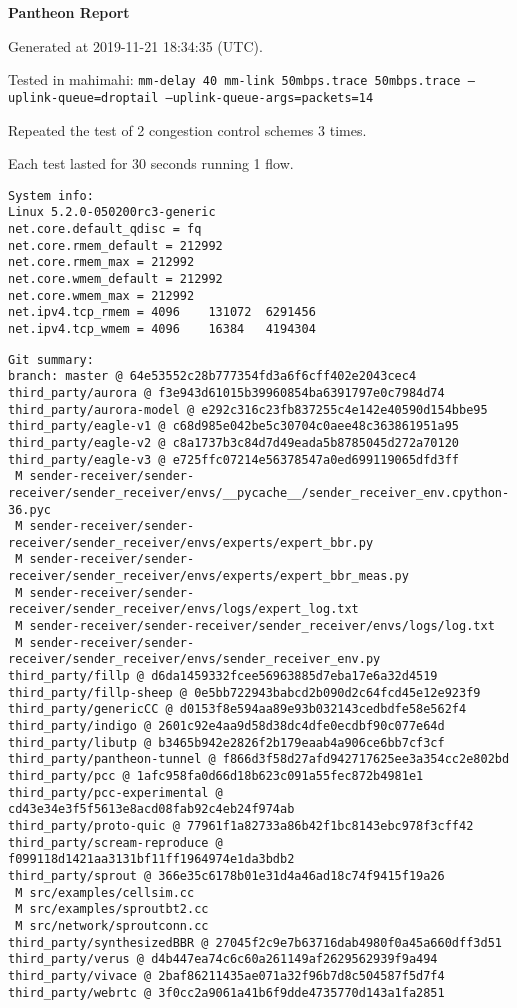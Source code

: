 \documentclass{article}
\begin{document}
\centerline{\textbf{\large{Pantheon Report}}}
\vspace{20pt}

Generated at 2019-11-21 18:34:35 (UTC).

Tested in mahimahi: \texttt{mm-delay 40 mm-link 50mbps.trace 50mbps.trace --uplink-queue=droptail --uplink-queue-args=packets=14}

Repeated the test of 2 congestion control schemes 3 times.

Each test lasted for 30 seconds running 1 flow.

\begin{verbatim}
System info:
Linux 5.2.0-050200rc3-generic
net.core.default_qdisc = fq
net.core.rmem_default = 212992
net.core.rmem_max = 212992
net.core.wmem_default = 212992
net.core.wmem_max = 212992
net.ipv4.tcp_rmem = 4096	131072	6291456
net.ipv4.tcp_wmem = 4096	16384	4194304
\end{verbatim}

\begin{verbatim}
Git summary:
branch: master @ 64e53552c28b777354fd3a6f6cff402e2043cec4
third_party/aurora @ f3e943d61015b39960854ba6391797e0c7984d74
third_party/aurora-model @ e292c316c23fb837255c4e142e40590d154bbe95
third_party/eagle-v1 @ c68d985e042be5c30704c0aee48c363861951a95
third_party/eagle-v2 @ c8a1737b3c84d7d49eada5b8785045d272a70120
third_party/eagle-v3 @ e725ffc07214e56378547a0ed699119065dfd3ff
 M sender-receiver/sender-receiver/sender_receiver/envs/__pycache__/sender_receiver_env.cpython-36.pyc
 M sender-receiver/sender-receiver/sender_receiver/envs/experts/expert_bbr.py
 M sender-receiver/sender-receiver/sender_receiver/envs/experts/expert_bbr_meas.py
 M sender-receiver/sender-receiver/sender_receiver/envs/logs/expert_log.txt
 M sender-receiver/sender-receiver/sender_receiver/envs/logs/log.txt
 M sender-receiver/sender-receiver/sender_receiver/envs/sender_receiver_env.py
third_party/fillp @ d6da1459332fcee56963885d7eba17e6a32d4519
third_party/fillp-sheep @ 0e5bb722943babcd2b090d2c64fcd45e12e923f9
third_party/genericCC @ d0153f8e594aa89e93b032143cedbdfe58e562f4
third_party/indigo @ 2601c92e4aa9d58d38dc4dfe0ecdbf90c077e64d
third_party/libutp @ b3465b942e2826f2b179eaab4a906ce6bb7cf3cf
third_party/pantheon-tunnel @ f866d3f58d27afd942717625ee3a354cc2e802bd
third_party/pcc @ 1afc958fa0d66d18b623c091a55fec872b4981e1
third_party/pcc-experimental @ cd43e34e3f5f5613e8acd08fab92c4eb24f974ab
third_party/proto-quic @ 77961f1a82733a86b42f1bc8143ebc978f3cff42
third_party/scream-reproduce @ f099118d1421aa3131bf11ff1964974e1da3bdb2
third_party/sprout @ 366e35c6178b01e31d4a46ad18c74f9415f19a26
 M src/examples/cellsim.cc
 M src/examples/sproutbt2.cc
 M src/network/sproutconn.cc
third_party/synthesizedBBR @ 27045f2c9e7b63716dab4980f0a45a660dff3d51
third_party/verus @ d4b447ea74c6c60a261149af2629562939f9a494
third_party/vivace @ 2baf86211435ae071a32f96b7d8c504587f5d7f4
third_party/webrtc @ 3f0cc2a9061a41b6f9dde4735770d143a1fa2851
\end{verbatim}
\end{document}

